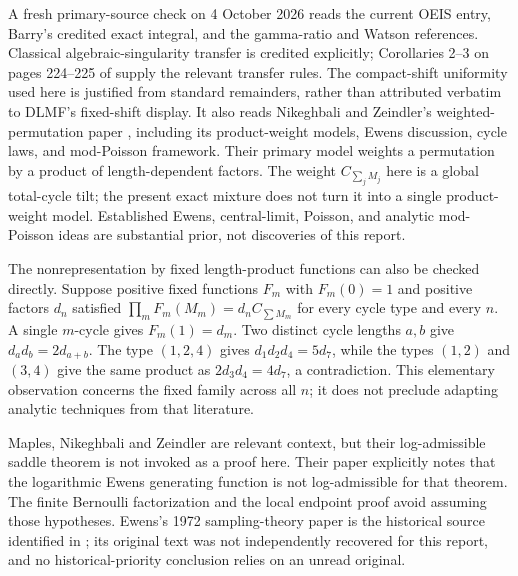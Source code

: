 \documentclass[11pt,letterpaper]{article}
\numberwithin{equation}{section}
\theoremstyle{remark}\newtheorem{remark}[theorem]{Remark}
\begin{document}
A fresh primary-source check on 4 October 2026 reads the current OEIS entry, Barry's credited exact integral, and the gamma-ratio and Watson references. Classical algebraic-singularity transfer is credited explicitly; Corollaries 2--3 on pages 224--225 of \cite{flajoletodlyzko} supply the relevant transfer rules. The compact-shift uniformity used here is justified from standard remainders, rather than attributed verbatim to DLMF's fixed-shift display. It also reads Nikeghbali and Zeindler's weighted-permutation paper \cite{nz}, including its product-weight models, Ewens discussion, cycle laws, and mod-Poisson framework. Their primary model weights a permutation by a product of length-dependent factors. The weight $C_{\sum_j M_j}$ here is a global total-cycle tilt; the present exact mixture does not turn it into a single product-weight model. Established Ewens, central-limit, Poisson, and analytic mod-Poisson ideas are substantial prior, not discoveries of this report.

The nonrepresentation by fixed length-product functions can also be checked directly. Suppose positive fixed functions $F_m$ with $F_m(0)=1$ and positive factors $d_n$ satisfied $\prod_m F_m(M_m)=d_n C_{\sum M_m}$ for every cycle type and every $n$. A single $m$-cycle gives $F_m(1)=d_m$. Two distinct cycle lengths $a,b$ give $d_a d_b=2d_{a+b}$. The type $(1,2,4)$ gives $d_1d_2d_4=5d_7$, while the types $(1,2)$ and $(3,4)$ give the same product as $2d_3d_4=4d_7$, a contradiction. This elementary observation concerns the fixed family across all $n$; it does not preclude adapting analytic techniques from that literature.

Maples, Nikeghbali and Zeindler \cite{mnz} are relevant context, but their log-admissible saddle theorem is not invoked as a proof here. Their paper explicitly notes that the logarithmic Ewens generating function is not log-admissible for that theorem. The finite Bernoulli factorization and the local endpoint proof avoid assuming those hypotheses. Ewens's 1972 sampling-theory paper is the historical source identified in \cite{nz}; its original text was not independently recovered for this report, and no historical-priority conclusion relies on an unread original.
\end{document}
